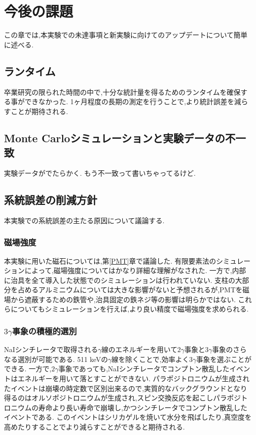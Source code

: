 \chapter{今後の課題}\label{prospect}

この章では,本実験での未達事項と新実験に向けてのアップデートについて簡単に述べる.

\section{ランタイム}
卒業研究の限られた時間の中で,十分な統計量を得るためのランタイムを確保する事ができなかった.
1ヶ月程度の長期の測定を行うことで,より統計誤差を減らすことが期待される.

\section{Monte Carloシミュレーションと実験データの不一致}
実験データがでたらかく.
もう不一致って書いちゃってるけど.

\section{系統誤差の削減方針}
本実験での系統誤差の主たる原因について議論する.

\subsection{磁場強度}
本実験に用いた磁石については,第\ref{PMT}章で議論した.
有限要素法のシミュレーションによって,磁場強度についてはかなり詳細な理解がなされた.
一方で,内部に治具を全て導入した状態でのシミュレーションは行われていない.
支柱の大部分を占めるアルミニウムについては大きな影響がないと予想されるが,PMTを磁場から遮蔽するための鉄管や,治具固定の鉄ネジ等の影響は明らかではない.
これらについてもシミュレーションを行えば,より良い精度で磁場強度を求められる.

\subsection{$3\gamma$事象の積極的選別}
NaIシンチレータで取得される$\gamma$線のエネルギーを用いて$2\gamma$事象と$3\gamma$事象のさらなる選別が可能である.
511 keVの$\gamma$線を除くことで,効率よく$3\gamma$事象を選ぶことができる.
一方で,$2\gamma$事象であっても,NaIシンチレータでコンプトン散乱したイベントはエネルギーを用いて落とすことができない.
パラポジトロニウムが生成されたイベントは崩壊の時定数で区別出来るので,実質的なバックグラウンドとなり得るのはオルソポジトロニウムが生成され,スピン交換反応を起こしパラポジトロニウムの寿命より長い寿命で崩壊し,かつシンチレータでコンプトン散乱したイベントである.
このイベントはシリカゲルを焼いて水分を飛ばしたり,真空度を高めたりすることでより減らすことができると期待される.


